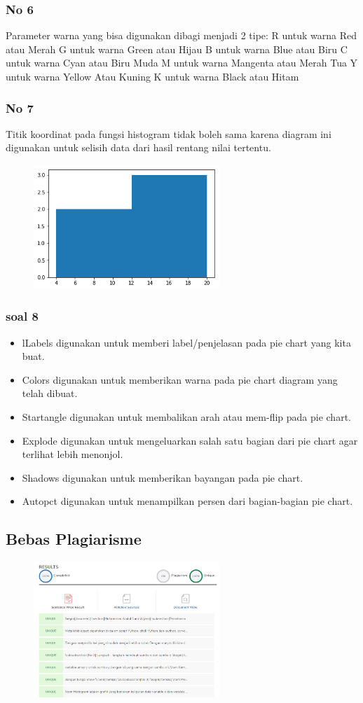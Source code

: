 \subsubsection{No 6}
Parameter warna yang bisa digunakan dibagi menjadi 2 tipe:
R untuk warna Red atau Merah
G untuk warna Green atau Hijau
B untuk warna Blue atau Biru
C untuk warna Cyan atau Biru Muda
M untuk warna Mangenta atau Merah Tua
Y untuk warna Yellow Atau Kuning
K untuk warna Black atau Hitam

\subsubsection{No 7}
Titik koordinat pada fungsi histogram tidak boleh sama karena diagram ini digunakan untuk selisih data dari hasil rentang nilai tertentu.
\begin{figure}[H]
\centering
\includegraphics[width=7cm]{figures/6/1174071/Teori/hist.png}
\end{figure}


\subsubsection{soal 8}
\begin{itemize}
\item lLabels digunakan untuk memberi label/penjelasan pada pie chart yang kita buat.
\item Colors digunakan untuk memberikan warna pada pie chart diagram yang telah dibuat.
\item Startangle digunakan untuk membalikan arah atau mem-flip pada pie chart.
\item Explode digunakan untuk mengeluarkan salah satu bagian dari pie chart agar terlihat lebih menonjol.
\item Shadows digunakan untuk memberikan bayangan pada pie chart.
\item Autopct digunakan untuk menampilkan persen dari bagian-bagian pie chart.
\end{itemize}

\subsection{Bebas Plagiarisme}
\begin{figure}[H]
\centering
\includegraphics[width=7cm]{figures/6/1174071/Teori/plagiarisme.png}
\end{figure}
